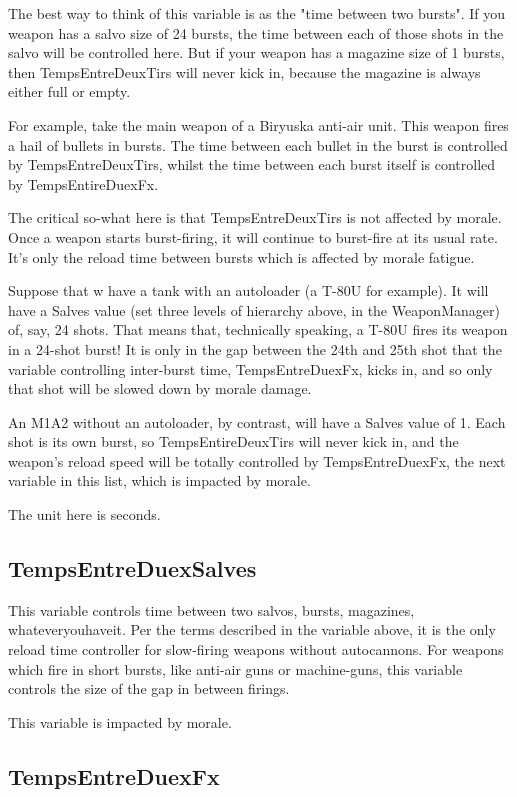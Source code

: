 \documentclass{article}
\begin{document}
The best way to think of this variable is as the "time between two bursts". If you weapon has a salvo size of 24 bursts, the time between each of those shots in the salvo will be controlled here. But if your weapon has a magazine size of 1 bursts, then TempsEntreDeuxTirs will never kick in, because the magazine is always either full or empty.

For example, take the main weapon of a Biryuska anti-air unit. This weapon fires a hail of bullets in bursts. The time between each bullet in the burst is controlled by TempsEntreDeuxTirs, whilst the time between each burst itself is controlled by TempsEntireDuexFx.

The critical so-what here is that TempsEntreDeuxTirs is not affected by morale. Once a weapon starts burst-firing, it will continue to burst-fire at its usual rate. It's only the reload time between bursts which is affected by morale fatigue.

Suppose that w have a tank with an autoloader (a T-80U for example). It will have a Salves value (set three levels of hierarchy above, in the WeaponManager) of, say, 24 shots. That means that, technically speaking, a T-80U fires its weapon in a 24-shot burst! It is only in the gap between the 24th and 25th shot that the variable controlling inter-burst time, TempsEntreDuexFx, kicks in, and so only that shot will be slowed down by morale damage.

An M1A2 without an autoloader, by contrast, will have a Salves value of 1. Each shot is its own burst, so TempsEntireDeuxTirs will never kick in, and the weapon's reload speed will be totally controlled by TempsEntreDuexFx, the next variable in this list, which is impacted by morale.

The unit here is seconds.

\subsection{TempsEntreDuexSalves}

This variable controls time between two salvos, bursts, magazines, whateveryouhaveit. Per the terms described in the variable above, it is the only reload time controller for slow-firing weapons without autocannons. For weapons which fire in short bursts, like anti-air guns or machine-guns, this variable controls the size of the gap in between firings.

This variable is impacted by morale.

\subsection{TempsEntreDuexFx}
\end{document}
